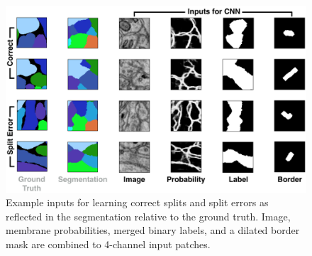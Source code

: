 \begin{figure}[h]
\begin{center}
  \includegraphics[width=\linewidth]{gfx/cnn_inputs.png}
\end{center}
  \vspace{-4mm}
   \caption{Example inputs for learning correct splits and split errors as reflected in the segmentation relative to the ground truth. Image, membrane probabilities, merged binary labels, and a dilated border mask are combined to 4-channel input patches.}
\label{fig:cnn_inputs}
\end{figure}

